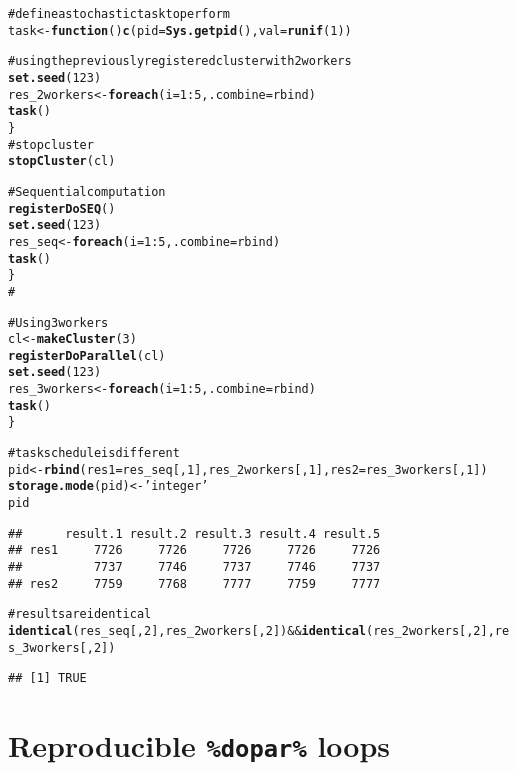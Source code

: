 \documentclass[a4paper,12pt]{article}\usepackage{graphicx, color}
\makeatletter
\newcommand{\hlfunctioncall}[1]{\textcolor[rgb]{0.501960784313725,0,0.329411764705882}{\textbf{#1}}}%
\newcommand{\hlstring}[1]{\textcolor[rgb]{0.6,0.6,1}{#1}}%
\newcommand{\hlcomment}[1]{\textcolor[rgb]{0.180392156862745,0.6,0.341176470588235}{#1}}%
\newenvironment{kframe}{%
 \def\at@end@of@kframe{}%
 \ifinner\ifhmode%
  \def\at@end@of@kframe{\end{minipage}}%
  \begin{minipage}{\columnwidth}%
 \fi\fi%
 \def\FrameCommand##1{\hskip\@totalleftmargin \hskip-\fboxsep
 \colorbox{shadecolor}{##1}\hskip-\fboxsep
     \hskip-\linewidth \hskip-\@totalleftmargin \hskip\columnwidth}%
 \MakeFramed {\advance\hsize-\width
   \@totalleftmargin\z@ \linewidth\hsize
   \@setminipage}}%
 {\par\unskip\endMakeFramed%
 \at@end@of@kframe}
\newenvironment{knitrout}{}{} %
\renewenvironment{knitrout}{\begin{footnotesize}}{\end{footnotesize}}
\makeatother
\begin{document}
\begin{knitrout}
\color{fgcolor}\begin{kframe}
\begin{alltt}

\hlcomment{# define a stochastic task to perform}
task <- \hlfunctioncall{function}() \hlfunctioncall{c}(pid=\hlfunctioncall{Sys.getpid}(), val=\hlfunctioncall{runif}(1))

\hlcomment{# using the previously registered cluster with 2 workers}
\hlfunctioncall{set.seed}(123)
res_2workers <- \hlfunctioncall{foreach}(i=1:5, .combine=rbind) %dorng% \{
	\hlfunctioncall{task}()
\}
\hlcomment{# stop cluster}
\hlfunctioncall{stopCluster}(cl)

\hlcomment{# Sequential computation}
\hlfunctioncall{registerDoSEQ}()
\hlfunctioncall{set.seed}(123)
res_seq <- \hlfunctioncall{foreach}(i=1:5, .combine=rbind) %dorng% \{
	\hlfunctioncall{task}() 
\}
\hlcomment{#}

\hlcomment{# Using 3 workers}
cl <- \hlfunctioncall{makeCluster}(3)
\hlfunctioncall{registerDoParallel}(cl)
\hlfunctioncall{set.seed}(123)
res_3workers <- \hlfunctioncall{foreach}(i=1:5, .combine=rbind) %dorng% \{ 
	\hlfunctioncall{task}()
\}

\hlcomment{# task schedule is different}
pid <- \hlfunctioncall{rbind}(res1=res_seq[,1], res_2workers[,1], res2=res_3workers[,1])
\hlfunctioncall{storage.mode}(pid) <- \hlstring{'integer'}
pid
\end{alltt}
\begin{verbatim}
##      result.1 result.2 result.3 result.4 result.5
## res1     7726     7726     7726     7726     7726
##          7737     7746     7737     7746     7737
## res2     7759     7768     7777     7759     7777
\end{verbatim}
\begin{alltt}
\hlcomment{# results are identical}
\hlfunctioncall{identical}(res_seq[,2], res_2workers[,2]) && \hlfunctioncall{identical}(res_2workers[,2], res_3workers[,2])
\end{alltt}
\begin{verbatim}
## [1] TRUE
\end{verbatim}
\end{kframe}
\end{knitrout}


\section{Reproducible \texttt{\%dopar\%} loops}
\end{document}
